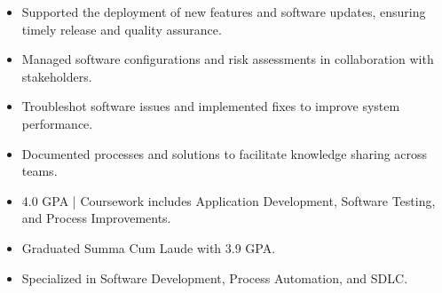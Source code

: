 \par\smallskip
\noindent
\begin{minipage}{20cm}
  \begin{minipage}{9.75cm}
    \begin{itemize}
      \item Supported the deployment of new features and software updates, ensuring timely release and quality assurance.
      \item Managed software configurations and risk assessments in collaboration with stakeholders.
    \end{itemize}
  \end{minipage}
  \hfill
  \begin{minipage}{9.75cm}
    \begin{itemize}
      \item Troubleshot software issues and implemented fixes to improve system performance.
      \item Documented processes and solutions to facilitate knowledge sharing across teams.
    \end{itemize}
  \end{minipage}
\end{minipage}
\par\smallskip
\divider

\begin{itemize}
  \item 4.0 GPA | Coursework includes Application Development, Software Testing, and Process Improvements.
\end{itemize}
\divider

\begin{itemize}
  \item Graduated Summa Cum Laude with 3.9 GPA.
  \item Specialized in Software Development, Process Automation, and SDLC.
\end{itemize}

\noindent
\begin{minipage}{20cm}
\end{minipage}


